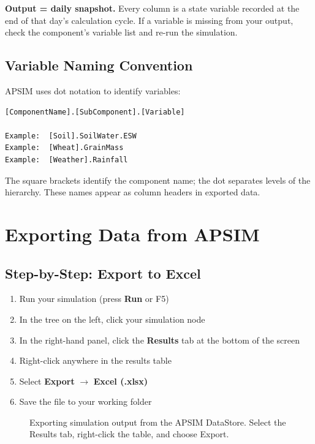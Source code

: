 \begin{keyconceptbox}
\textbf{Output = daily snapshot.} Every column is a state variable recorded at the end of that day's calculation cycle. If a variable is missing from your output, check the  component's variable list and re-run the simulation.
\end{keyconceptbox}

\subsection{Variable Naming Convention}

APSIM uses dot notation to identify variables:

\begin{verbatim}
[ComponentName].[SubComponent].[Variable]

Example:  [Soil].SoilWater.ESW
Example:  [Wheat].GrainMass
Example:  [Weather].Rainfall
\end{verbatim}

The square brackets identify the component name; the dot separates levels of the hierarchy. These names appear as column headers in exported data.

\section{Exporting Data from APSIM}

\subsection{Step-by-Step: Export to Excel}

\begin{enumerate}
  \item Run your simulation (press \textbf{Run} or F5)
  \item In the  tree on the left, click your simulation node
  \item In the right-hand panel, click the \textbf{Results} tab at the bottom of the screen
  \item Right-click anywhere in the results table
  \item Select \textbf{Export} $\to$ \textbf{Excel (.xlsx)}
  \item Save the file to your working folder
\end{enumerate}

\begin{figure}[H]
  \centering
  \caption{Exporting simulation output from the APSIM DataStore. Select the Results tab, right-click the table, and choose Export.}
  \label{fig:datastore-export}
\end{figure}

